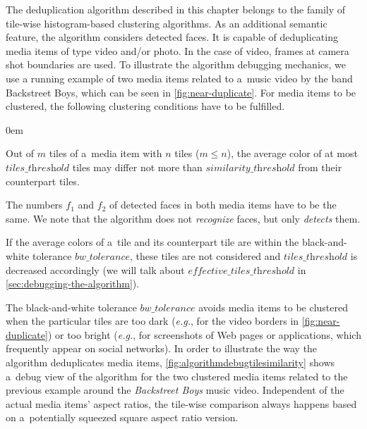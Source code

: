 The deduplication algorithm described in this chapter
belongs to the family of tile-wise histogram-based clustering algorithms.
As an additional semantic feature, the algorithm considers detected faces.
It is capable of deduplicating media items of type video and/or photo.
In the case of video, frames at camera shot boundaries are used.
To illustrate the algorithm debugging mechanics,
we use a running example of two media items related to a~music video by the 
band Backstreet Boys, which can be seen in \autoref{fig:near-duplicate}.
For media items to be clustered,
the following clustering conditions have to be fulfilled.

\begin{description}
  \itemsep0em
  \item[Cond.~1] Out of $m$ tiles of a~media item with $n$ tiles ($m \leq n$),
    the average color of at most $\textit{tiles\_threshold}$ tiles
    may differ not more than $\textit{similarity\_threshold}$
    from their counterpart tiles.
  \item[Cond.~2] The numbers $f_1$ and $f_2$ of detected faces
    in both media items have to be the same.
    We note that the algorithm does not \emph{recognize} faces,
    but only \emph{detects} them.
  \item[Cond.~3] If the average colors of a~tile and its counterpart tile
    are within the black-and-white tolerance $\textit{bw\_tolerance}$,
    these tiles are not considered and $\textit{tiles\_threshold}$
    is decreased accordingly (we will talk about $\textit{effective\_tiles\_threshold}$
    in \autoref{sec:debugging-the-algorithm}).
\end{description}

The black-and-white tolerance $\textit{bw\_tolerance}$ avoids media items
to be clustered when the particular tiles are too dark (\emph{e.g.},
for the video borders in \autoref{fig:near-duplicate}) or too bright (\emph{e.g.},
for screenshots of Web pages or applications, which frequently appear on social networks).
In order to illustrate the way the algorithm deduplicates media items,
\autoref{fig:algorithmdebugtilesimilarity} shows a~debug view of the algorithm
for the two clustered media items related to the previous example
around the \emph{Backstreet Boys} music video.
Independent of the actual media items' aspect ratios,
the tile-wise comparison always happens based on
a~potentially squeezed square aspect ratio version.

